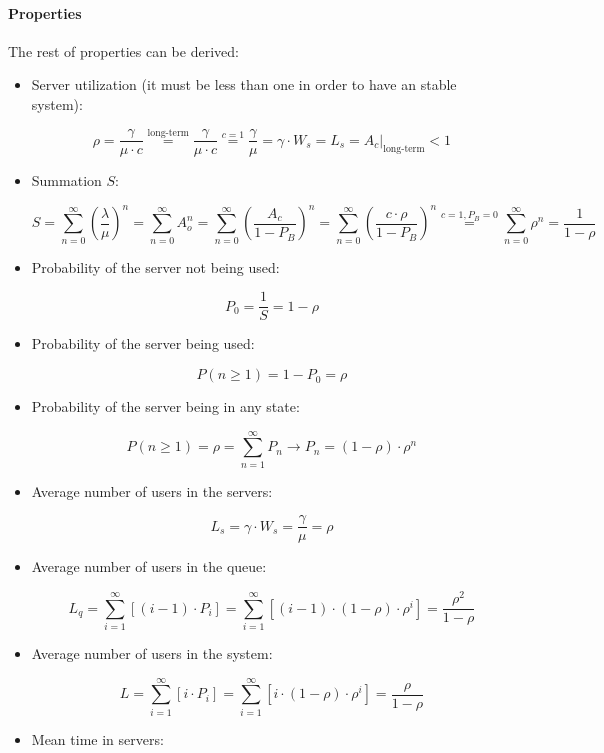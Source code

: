 \documentclass[../main.tex]{subfiles}
\begin{document}
\paragraph{Properties}

The rest of properties can be derived:

\begin{itemize}
	\item {
		Server utilization (it must be less than one in order to have an stable system):

		$$
			\rho =
			\frac {\gamma} {\mu \cdot c} \overset {\textrm{long-term}} {=}
			\frac {\gamma} {\mu \cdot c} \overset {c=1} {=}
			\frac {\gamma} {\mu} =
			\gamma \cdot W_s =
			L_s =
			\left. A_c \right|_{\textrm{long-term}} < 1
		$$
	}
	\item {
		Summation $S$:

		$$
			S =
			\sum_{n=0}^{\infty} \left( \frac {\lambda} {\mu} \right)^n =
			\sum_{n=0}^{\infty} A_o^n =
			\sum_{n=0}^{\infty} \left( \frac {A_c} {1 - P_B} \right)^n =
			\sum_{n=0}^{\infty} \left( \frac {c \cdot \rho} {1 - P_B} \right)^n \overset {c=1, P_B=0} {=}
			\sum_{n=0}^{\infty} \rho^n =
			\frac {1} {1 - \rho}
		$$
	}
	\item {
		Probability of the server not being used:

		$$
			P_0 = \frac {1} {S} = 1 - \rho
		$$
	}
	\item {
		Probability of the server being used:

		$$
			P(n \geq 1) = 1 - P_0 = \rho
		$$
	}
	\item {
		Probability of the server being in any state:

		$$
			P(n \geq 1) = \rho = \sum_{n=1}^{\infty} P_n \rightarrow P_n = (1 - \rho) \cdot \rho^n
		$$
	}
	\item {
		Average number of users in the servers:

		$$
			L_s = \gamma \cdot W_s = \frac {\gamma} {\mu} = \rho
		$$
	}
	\item {
		Average number of users in the queue:

		$$
			L_q = \sum_{i=1}^{\infty} \left[ (i-1) \cdot P_i \right] =
			\sum_{i=1}^{\infty} \left[ (i-1) \cdot (1-\rho) \cdot \rho^i \right] =
			\frac {\rho^2} {1-\rho}
		$$
	}
	\item {
		Average number of users in the system:

		$$
			L = \sum_{i=1}^{\infty} \left[ i \cdot P_i \right] =
			\sum_{i=1}^{\infty} \left[ i \cdot (1-\rho) \cdot \rho^i \right] =
			\frac {\rho} {1-\rho}
		$$
	}
	\item {
		Mean time in servers:

}
\end{itemize}
\end{document}
